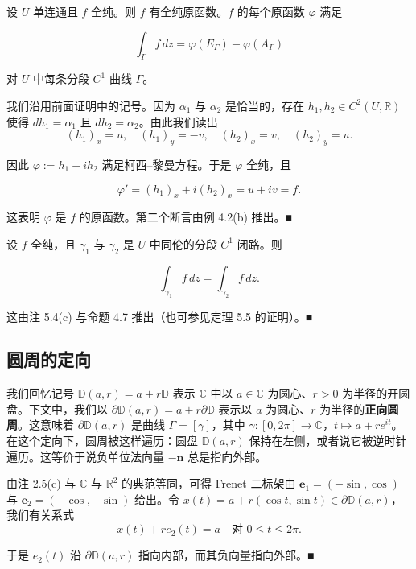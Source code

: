 \begin{theorem}

设 $ U $ 单连通且 $ f $ 全纯。则 $ f $ 有全纯原函数。$ f $ 的每个原函数 $ \varphi $ 满足

\[
\int_{\Gamma}f\,dz = \varphi(E_{\Gamma}) - \varphi(A_{\Gamma})
\]

对 $ U $ 中每条分段 $ C^{1} $ 曲线 $ \Gamma $。

\proofhead
我们沿用前面证明中的记号。因为 $ \alpha_{1} $ 与 $ \alpha_{2} $ 是恰当的，存在 $ h_{1}, h_{2} \in C^{2}(U,\mathbb{R}) $ 使得 $ dh_{1} = \alpha_{1} $ 且 $ dh_{2} = \alpha_{2} $。由此我们读出
\[
(h_{1})_{x} = u , \quad (h_{1})_{y} = -v , \quad (h_{2})_{x} = v , \quad (h_{2})_{y} = u .
\]

因此 $ \varphi := h_{1} + ih_{2} $ 满足柯西–黎曼方程。于是 $ \varphi $ 全纯，且

\[
\varphi' = (h_{1})_{x} + i(h_{2})_{x} = u + iv = f .
\]

这表明 $ \varphi $ 是 $ f $ 的原函数。第二个断言由例 4.2(b) 推出。\nobreak\hspace{0.35em}■

\end{theorem}

\begin{proposition}

设 $ f $ 全纯，且 $ \gamma_{1} $ 与 $ \gamma_{2} $ 是 $ U $ 中同伦的分段 $ C^{1} $ 闭路。则

\[
\int_{\gamma_{1}}f\,dz = \int_{\gamma_{2}}f\,dz .
\]

\proofhead
这由注 5.4(c) 与命题 4.7 推出（也可参见定理 5.5 的证明）。\nobreak\hspace{0.35em}■
\end{proposition}

\subsection*{圆周的定向}

\begin{remark}

我们回忆记号 $ \mathbb{D}(a,r) = a + r\mathbb{D} $ 表示 $ \mathbb{C} $ 中以 $ a \in \mathbb{C} $ 为圆心、$ r > 0 $ 为半径的开圆盘。下文中，我们以 $ \partial\mathbb{D}(a,r) = a + r\partial\mathbb{D} $ 表示以 $ a $ 为圆心、$ r $ 为半径的\textbf{正向圆周}。这意味着 $ \partial\mathbb{D}(a,r) $ 是曲线 $ \Gamma = [\gamma] $，其中 $ \gamma : [0,2\pi] \to \mathbb{C} $，$ t \mapsto a + re^{it} $。在这个定向下，圆周被这样遍历：圆盘 $ \mathbb{D}(a,r) $ 保持在左侧，或者说它被逆时针遍历。这等价于说负单位法向量 $ -\mathbf{n} $ 总是指向外部。

\proofhead
由注 2.5(c) 与 $ \mathbb{C} $ 与 $ \mathbb{R}^{2} $ 的典范等同，可得 Frenet 二标架由 $ \mathbf{e}_{1} = (-\sin,\cos) $ 与 $ \mathbf{e}_{2} = (-\cos,-\sin) $ 给出。令 $ x(t) = a + r(\cos t,\sin t) \in \partial\mathbb{D}(a,r) $，我们有关系式
\[
x(t) + re_{2}(t) = a \quad \text{对 } 0 \le t \le 2\pi .
\]

于是 $ e_{2}(t) $ 沿 $ \partial\mathbb{D}(a,r) $ 指向内部，而其负向量指向外部。\nobreak\hspace{0.35em}■

\end{remark}

